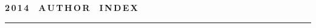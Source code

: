 
\def\stat{cont-e}
{%
\raggedleft\Large \bf%
2\,0\,1\,4\ \ A\,U\,T\,H\,O\,R\ \ I\,N\,D\,E\,X \vskip 17pt
    \hrule
    \par
{} }

\label{st\stat}

\def\tit{\ }

\def\aut{\ }
\def\auf{\ }

\def\leftkol{\ } %

\def\rightkol{\ } %

\titele{\tit}{\aut}{\auf}{\leftkol}{\rightkol}

\def\leftfootline{\small{\textbf{\thepage}
\hfill INFORMATIKA I EE PRIMENENIYA~--- INFORMATICS AND APPLICATIONS\ \ \ 2014\
\ \ volume~8\ \ \ issue\ 4}
}%
 \def\rightfootline{\small{INFORMATIKA I EE PRIMENENIYA~--- INFORMATICS AND APPLICATIONS\ \ \ 2014\ \ \ volume~8\ \ \ issue\ 4
\hfill \textbf{\thepage}}}

\vspace*{-12pt}
\vspace*{-12pt}

